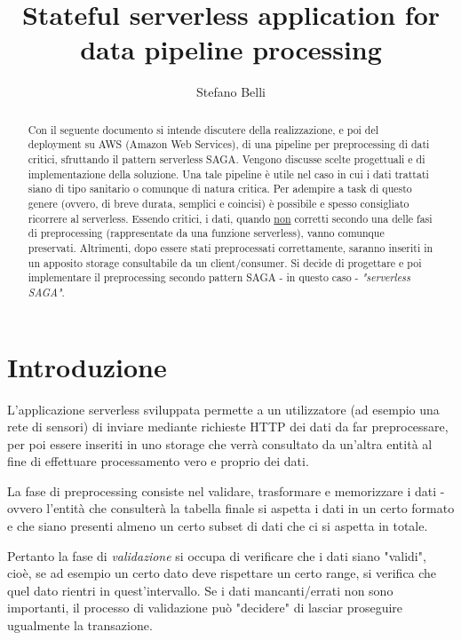 \documentclass[
    sigconf, 
    screen=false, 
    acmthm=false, 
    nonacm
]{acmart}
\title{Stateful serverless application for data pipeline processing}
\author{Stefano Belli}
\affiliation{
    \institution{Università degli Studi di Roma Tor Vergata}
    \department{Macroarea di Ingegneria}
    \city{Roma}
    \state{Lazio}
    \country{Italia}
}
\begin{document}

\begin{abstract}
Con il seguente documento si intende discutere della realizzazione, e poi
del deployment su AWS (Amazon Web Services), di
una pipeline per preprocessing di dati critici, sfruttando il pattern serverless SAGA. 
Vengono discusse scelte progettuali e di implementazione della soluzione. 
Una tale pipeline è utile nel caso in cui i dati trattati siano di tipo sanitario o comunque di natura
critica. Per adempire a task di questo genere (ovvero, di breve durata, semplici e coincisi)
è possibile e spesso consigliato ricorrere al serverless. Essendo critici, i dati, quando
\underline{non} corretti secondo una delle fasi di preprocessing (rappresentate da una funzione serverless),
vanno comunque preservati. Altrimenti, dopo essere stati preprocessati correttamente, saranno inseriti in un 
apposito storage consultabile da un client/consumer. Si decide di progettare e poi implementare il 
preprocessing secondo pattern SAGA - in questo caso - \textit{"serverless SAGA"}.
\end{abstract}

\maketitle

\section{Introduzione}
L'applicazione serverless sviluppata permette a un utilizzatore (ad esempio una rete di sensori)
di inviare mediante richieste HTTP dei dati da far preprocessare, per poi essere inseriti
in uno storage che verrà consultato da un'altra entità al fine di effettuare processamento vero e proprio dei
dati.

La fase di preprocessing consiste nel validare, trasformare e memorizzare i dati - ovvero l'entità
che consulterà la tabella finale si aspetta i dati in un certo formato e che siano presenti almeno un certo
subset di dati che ci si aspetta in totale. 

Pertanto la fase di \textit{validazione} si occupa di verificare che i
dati siano "validi", cioè, se ad esempio un certo dato deve rispettare un certo range, si verifica che
quel dato rientri in quest'intervallo. Se i dati mancanti/errati non sono importanti, il processo di validazione
può "decidere" di lasciar proseguire ugualmente la transazione.
\end{document}
